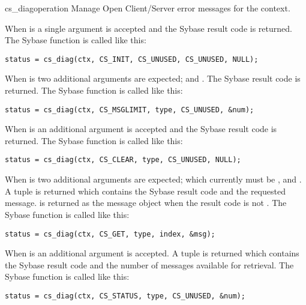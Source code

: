 \begin{methoddesc}[CS_CONTEXT]{cs_diag}{operation \optional{, \ldots}}
Manage Open Client/Server error messages for the context.

When  is  a single argument is accepted
and the Sybase result code is returned.  The Sybase
 function is called like this:

\begin{verbatim}
status = cs_diag(ctx, CS_INIT, CS_UNUSED, CS_UNUSED, NULL);
\end{verbatim}

When  is  two additional arguments
are expected;  and .  The Sybase result code is
returned.  The Sybase  function is called like
this:

\begin{verbatim}
status = cs_diag(ctx, CS_MSGLIMIT, type, CS_UNUSED, &num);
\end{verbatim}

When  is  an additional 
argument is accepted and the Sybase result code is returned.  The
Sybase  function is called like this:

\begin{verbatim}
status = cs_diag(ctx, CS_CLEAR, type, CS_UNUSED, NULL);
\end{verbatim}

When  is  two additional arguments are
expected;  which currently must be ,
and .  A tuple is returned which contains the Sybase result
code and the requested  message.   is
returned as the message object when the result code is not
.  The Sybase  function is called
like this:

\begin{verbatim}
status = cs_diag(ctx, CS_GET, type, index, &msg);
\end{verbatim}

When  is  an additional 
argument is accepted.  A tuple is returned which contains the Sybase
result code and the number of messages available for retrieval.  The
Sybase  function is called like this:

\begin{verbatim}
status = cs_diag(ctx, CS_STATUS, type, CS_UNUSED, &num);
\end{verbatim}


\end{methoddesc}
